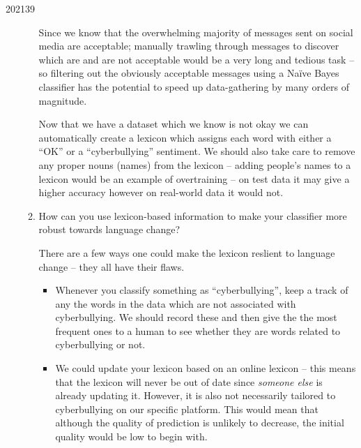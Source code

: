 \documentclass[10pt,\jkfside,a4paper]{article}
\begin{document}
\begin{examquestion}{2021}{3}{9}
\begin{enumerate}
\begin{enumerate}
Since we know that the overwhelming majority of messages sent on social media are acceptable; manually trawling through messages 
to discover which are and are not acceptable would be a very long and tedious task -- so filtering out the obviously 
acceptable messages using a Na\"ive Bayes classifier has the potential to speed up data-gathering by many orders of magnitude.

Now that we have a dataset which we know is not okay we can automatically create a lexicon which assigns each word 
with either a ``OK'' or a ``cyberbullying'' sentiment. We should also take care to remove any proper nouns (names) from 
the lexicon -- adding people's names to a lexicon would be an example of overtraining -- on test data it may give 
a higher accuracy however on real-world data it would not.

\item How can you use lexicon-based information to make your classifier more
robust towards language change?

There are a few ways one could make the lexicon reslient to language change -- they all have their flaws.

\begin{itemize}

\item Whenever you classify something as ``cyberbullying'', keep a track of any the words in the data which are 
not associated with cyberbullying. We should record these and then give the the most frequent ones to a human to 
see whether they are words related to cyberbullying or not.

\item We could update your lexicon based on an online lexicon -- this means that the lexicon will never be 
out of date since \textit{someone else} is already updating it. However, it is also not necessarily tailored to 
cyberbullying on our specific platform. This would mean that although the quality of prediction is unlikely to decrease, 
the initial quality would be low to begin with.

\end{itemize}

\end{enumerate}

\end{enumerate}

\end{examquestion}
\end{document}
